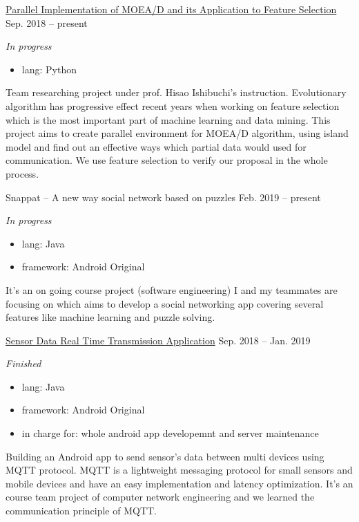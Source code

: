 \documentclass[hidelinks__VERSION__]{adamyi-cv}
\begin{document}
\begin{entrylist}


\entry
{\href{https://github.com/hackroid/pMOEA-D}{Parallel Implementation of MOEA/D and its Application to Feature Selection}}
{Sep. 2018 -- present}
{\emph{In progress}
\begin{itemize}
\item lang: Python
\end{itemize}
Team researching project under prof. Hisao Ishibuchi's instruction. Evolutionary algorithm has progressive effect recent years when working on feature selection which is the most important part of machine learning and data mining. This project aims to create parallel environment for MOEA/D algorithm, using island model and find out an effective ways which partial data would used for communication. We use feature selection to verify our proposal in the whole process.
}


\entry
{Snappat -- A new way social network based on puzzles}
{Feb. 2019 -- present}
{\emph{In progress}
\begin{itemize}
\item lang: Java
\item framework: Android Original
\end{itemize}
It's an on going course project (software engineering) I and my teammates are focusing on which aims to develop a social networking app covering several features like machine learning and puzzle solving.
}


\entry
{\href{https://github.com/hackroid/MqttSensorDemo}{Sensor Data Real Time Transmission Application}}
{Sep. 2018 -- Jan. 2019}
{\emph{Finished}
\begin{itemize}
\item lang: Java
\item framework: Android Original
\item in charge for: whole android app developemnt and server maintenance
\end{itemize}
Building an Android app to send sensor's data between multi devices using MQTT protocol. MQTT is a lightweight messaging protocol for small sensors and mobile devices and have an easy implementation and latency optimization. It's an course team project of computer network engineering and we learned the communication principle of MQTT.
}


\end{entrylist}
\end{document}
